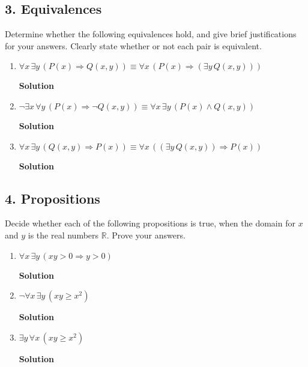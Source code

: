 \documentclass{article}
\begin{document}
\subsection*{3. Equivalences}
Determine whether the following equivalences hold, and give brief justifications for your
answers. Clearly state whether or not each pair is equivalent.
\begin{enumerate}
\item $\forall x\,\exists y\,(P(x)\Rightarrow Q(x,y))\equiv \forall x\,(P(x)\Rightarrow(\exists y\,Q(x,y)))$
\begin{mdframed}
\textbf{Solution}
\end{mdframed}
\item $\lnot\exists x\,\forall y\,(P(x)\Rightarrow\lnot Q(x,y))\equiv \forall x\,\exists y\,(P(x)\land Q(x,y))$
\begin{mdframed}
\textbf{Solution}
\end{mdframed}
\item $\forall x\,\exists y\,(Q(x,y)\Rightarrow P(x))\equiv \forall x\,((\exists y\, Q(x,y))\Rightarrow P(x))$
\begin{mdframed}
\textbf{Solution}
\end{mdframed}
\end{enumerate}

\subsection*{4. Propositions}
Decide whether each of the following propositions is true, when the domain for $x$ and $y$ is
the real numbers $\mathbb R$. Prove your answers.
\begin{enumerate}
\item $\forall x\,\exists y\,(xy>0\Rightarrow y>0)$
\begin{mdframed}
\textbf{Solution}
\end{mdframed}
\item $\lnot\forall x\,\exists y\,(xy\ge x^2)$
\begin{mdframed}
\textbf{Solution}
\end{mdframed}
\item $\exists y\,\forall x\,(xy\ge x^2)$
\begin{mdframed}
\textbf{Solution}
\end{mdframed}
\end{enumerate}
\end{document}
